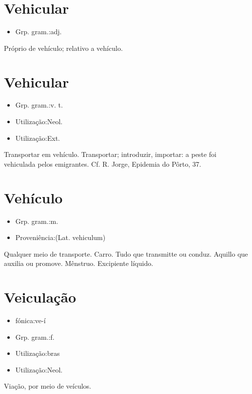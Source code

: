 \documentclass{article}
\begin{document}
\section{Vehicular}
\begin{itemize}
\item {Grp. gram.:adj.}
\end{itemize}
Próprio de vehículo; relativo a vehículo.
\section{Vehicular}
\begin{itemize}
\item {Grp. gram.:v. t.}
\end{itemize}
\begin{itemize}
\item {Utilização:Neol.}
\end{itemize}
\begin{itemize}
\item {Utilização:Ext.}
\end{itemize}
Transportar em vehículo.
Transportar; introduzir, importar: \textunderscore a peste foi vehiculada pelos emigrantes\textunderscore . Cf. R. Jorge, \textunderscore Epidemia do Pôrto\textunderscore , 37.
\section{Vehículo}
\begin{itemize}
\item {Grp. gram.:m.}
\end{itemize}
\begin{itemize}
\item {Proveniência:(Lat. \textunderscore vehiculum\textunderscore )}
\end{itemize}
Qualquer meio de transporte.
Carro.
Tudo que transmitte ou conduz.
Aquillo que auxilia ou promove.
Mênstruo.
Excipiente líquido.
\section{Veiculação}
\begin{itemize}
\item {fónica:ve-í}
\end{itemize}
\begin{itemize}
\item {Grp. gram.:f.}
\end{itemize}
\begin{itemize}
\item {Utilização:bras}
\end{itemize}
\begin{itemize}
\item {Utilização:Neol.}
\end{itemize}
Viação, por meio de veículos.
\end{document}
